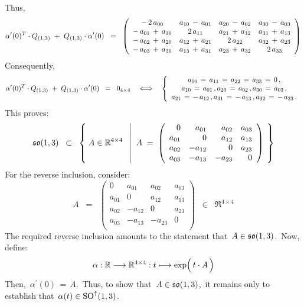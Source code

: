 Thus,
\begin{equation*}
\alpha^{\prime}(0)^{T} \cdot Q_{(1,3)} \;+\; Q_{(1,3)} \cdot \alpha^{\prime}(0)
\;\; = \;\;
	\left(\begin{array}{cccc}
	-\,2\,a_{00} & a_{10}\,-\,a_{01} & a_{20}\,-\,a_{02} & a_{30}\,-\,a_{03}
	\\
	-\,a_{01} \,+\, a_{10} & 2\,a_{11} & a_{21}\,+\,a_{12} & a_{31}\,+\,a_{13}
	\\
	-\,a_{02} \,+\, a_{20} & a_{12}\,+\,a_{21} & 2\,a_{22} & a_{32}\,+\,a_{23}
	\\
	-\,a_{03} \,+\, a_{30} & a_{13}\,+\,a_{31} & a_{23}\,+\,a_{32} & 2\,a_{33}
	\end{array}\right)
\end{equation*}
Consequently,
\begin{equation*}
\alpha^{\prime}(0)^{T} \cdot Q_{(1,3)} \;+\; Q_{(1,3)} \cdot \alpha^{\prime}(0) \;\; = \;\; 0_{4 \times 4}
\quad\Longleftrightarrow\quad
\left\{\begin{array}{c}
	a_{00} \,=\, a_{11} \,=\, a_{22} \,=\, a_{33} \,=\, 0\,,
	\\
	a_{10} \,=\, a_{01}\,, a_{20} \,=\, a_{02}\,, a_{30} \,=\, a_{03}\,,
	\\
	a_{21} \,=\, -\,a_{12}\,, a_{31} \,=\, -\,a_{13}\,, a_{32} \,=\, -\,a_{23}\,.
	\end{array}\right.
\end{equation*}
This proves:
\begin{equation*}
\so{(1,3)}
\;\; \subset \;\;
	\left\{\;
		A
		\overset{{\color{white}.}}{\in}
		\Re^{4 \times 4}
		\;\;\left\vert\;\;
			A \;=\;
			\left(\begin{array}{rrrr}
			        0 &   a_{01} &  a_{02} & a_{03} \\
			a_{01} &           0 &  a_{12} & a_{13} \\
			a_{02} & -a_{12} &           0 & a_{23} \\
			a_{03} & -a_{13} & -a_{23} &          0 \\
			\end{array}\right)
			\right.
		\;\right\}
\end{equation*}
For the reverse inclusion, consider:
\begin{equation*}
A
\;\; = \;\;
	\left(\begin{array}{rrrr}
	        0 &   a_{01} &  a_{02} & a_{03} \\
		a_{01} &           0 &  a_{12} & a_{13} \\
		a_{02} & -a_{12} &           0 & a_{23} \\
		a_{03} & -a_{13} & -a_{23} &          0 \\
		\end{array}\right)
\;\; \in \;\;
	\Re^{4 \times 4}
\end{equation*}
The required reverse inclusion amounts to the statement that \,$A \in \mathfrak{so}(1,3)$.\,
Now, define:
\begin{equation*}
\alpha : \Re \longrightarrow \Re^{4 \times 4} : t \longmapsto \exp\!\left(\,t \cdot \overset{{\color{white}.}}{A}\,\right)
\end{equation*}
Then, \,$\alpha^{\prime}(0) \,=\, A$.\,
Thus, to show that \,$A \in \mathfrak{so}(1,3)$,\, it remains only to establish that
\,$\alpha(t) \in \textnormal{SO}^{\uparrow}(1,3)$.\,

